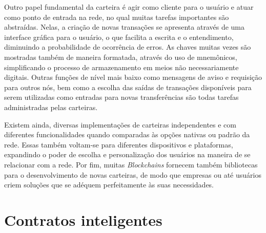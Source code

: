 %
Outro papel fundamental da carteira é agir como cliente para o usuário e atuar como ponto de entrada na rede, no qual muitas tarefas importantes são abstraídas. Nelas, a criação de novas transações se apresenta através de uma interface gráfica para o usuário, o que facilita a escrita e o entendimento, diminuindo a probabilidade de ocorrência de erros. As chaves muitas vezes são mostradas também de maneira formatada, através do uso de mnemônicos, simplificando o processo de armazenamento em meios não necessariamente digitais. Outras funções de nível mais baixo como mensagens de aviso e requisição para outros nós, bem como a escolha das saídas de transações disponíveis para serem utilizadas como entradas para novas transferências são todas tarefas administradas pelas carteiras.

%
Existem ainda, diversas implementações de carteiras independentes e com diferentes funcionalidades quando comparadas às opções nativas ou padrão da rede. Essas também voltam-se para diferentes dispositivos e plataformas, expandindo o poder de escolha e personalização dos usuários na maneira de se relacionar com a rede. Por fim, muitas \textit{Blockchains} fornecem também bibliotecas para o desenvolvimento de novas carteiras, de modo que empresas ou até usuários criem soluções que se adéquem perfeitamente às suas necessidades.


\section{Contratos inteligentes}
\label{sec:blockchain:smart_contracts}

